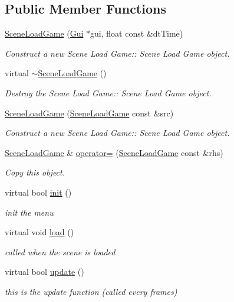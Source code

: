 \subsection*{Public Member Functions}
\begin{DoxyCompactItemize}
\item 
\hyperlink{class_scene_load_game_ad70a45aee99f33f244fbfaf71cee3a10}{Scene\+Load\+Game} (\hyperlink{class_gui}{Gui} $\ast$gui, float const \&dt\+Time)
\begin{DoxyCompactList}\small\item\em Construct a new Scene Load Game\+:\+: Scene Load Game object. \end{DoxyCompactList}\item 
\mbox{\label{class_scene_load_game_ab525e0731a66fda51bf3be580696c996}} 
virtual \hyperlink{class_scene_load_game_ab525e0731a66fda51bf3be580696c996}{$\sim$\+Scene\+Load\+Game} ()
\begin{DoxyCompactList}\small\item\em Destroy the Scene Load Game\+:\+: Scene Load Game object. \end{DoxyCompactList}\item 
\hyperlink{class_scene_load_game_a6975b7ed837cad31ed3e97b84305e63e}{Scene\+Load\+Game} (\hyperlink{class_scene_load_game}{Scene\+Load\+Game} const \&src)
\begin{DoxyCompactList}\small\item\em Construct a new Scene Load Game\+:\+: Scene Load Game object. \end{DoxyCompactList}\item 
\hyperlink{class_scene_load_game}{Scene\+Load\+Game} \& \hyperlink{class_scene_load_game_a4490f6bcd13404d4960110e06765e9b9}{operator=} (\hyperlink{class_scene_load_game}{Scene\+Load\+Game} const \&rhs)
\begin{DoxyCompactList}\small\item\em Copy this object. \end{DoxyCompactList}\item 
virtual bool \hyperlink{class_scene_load_game_a4ef89351e679b7f681fa55e5f723dd16}{init} ()
\begin{DoxyCompactList}\small\item\em init the menu \end{DoxyCompactList}\item 
\mbox{\label{class_scene_load_game_a9b4d74b6c0c41ea0155639fa0385aa7d}} 
virtual void \hyperlink{class_scene_load_game_a9b4d74b6c0c41ea0155639fa0385aa7d}{load} ()
\begin{DoxyCompactList}\small\item\em called when the scene is loaded \end{DoxyCompactList}\item 
virtual bool \hyperlink{class_scene_load_game_ad33de3b5d98596754f058a4e096ba1b3}{update} ()
\begin{DoxyCompactList}\small\item\em this is the update function (called every frames) \end{DoxyCompactList}\end{DoxyCompactItemize}
